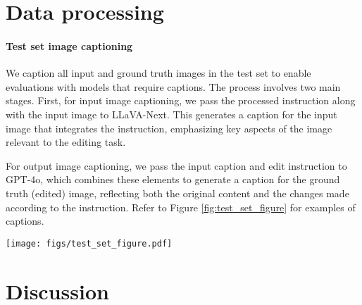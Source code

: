 
\section{Data processing}
\paragraph{Test set image captioning}

We caption all input and ground truth images in the test set to enable evaluations with models that require captions. The process involves two main stages. First, for input image captioning, we pass the processed instruction along with the input image to LLaVA-Next\cite{liu2024llavanext}. This generates a caption for the input image that integrates the instruction, emphasizing key aspects of the image relevant to the editing task.

For output image captioning, we pass the input caption and edit instruction to GPT-4o, which combines these elements to generate a caption for the ground truth (edited) image, reflecting both the original content and the changes made according to the instruction. Refer to Figure \ref{fig:test_set_figure} for examples of captions.





\begin{figure*}[!t]
    \centering
    \texttt{[image: figs/test\_set\_figure.pdf]}
    \caption{Examples of test set data with captions for input image and ground truth image.}
    \label{fig:test_set_figure}
\end{figure*}

\section{Discussion}
